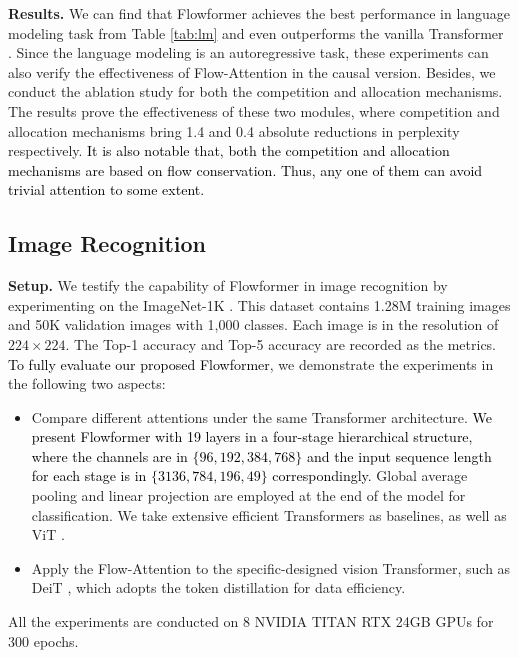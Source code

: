 \documentclass[nohyperref]{article}
\theoremstyle{plain}
\theoremstyle{definition}
\theoremstyle{remark}
\newcommand{\update}[1]{{\textcolor{black}{#1}}}
\begin{document}
\textbf{Results.} We can find that Flowformer achieves the best performance in language modeling task from Table \ref{tab:lm} and even outperforms the vanilla Transformer \cite{NIPS2017_3f5ee243}. Since the language modeling is an autoregressive task, these experiments can also verify the effectiveness of Flow-Attention in the causal version. Besides, we conduct the ablation study for both the competition and allocation mechanisms. The results prove the effectiveness of these two modules, where competition and allocation mechanisms bring 1.4 and 0.4 absolute reductions in perplexity respectively. \update{It is also notable that, both the competition and allocation mechanisms are based on flow conservation. Thus, any one of them can avoid trivial attention to some extent.}


\subsection{Image Recognition}

\textbf{Setup.} We testify the capability of Flowformer in image recognition by experimenting on the ImageNet-1K \cite{Deng2009ImageNetAL}. This dataset contains 1.28M training images and 50K validation images with 1,000 classes. Each image is in the resolution of $224\times 224$. The Top-1 accuracy and Top-5 accuracy are recorded as the metrics. \update{To fully evaluate our proposed Flowformer}, we demonstrate the experiments in the following two aspects:
\begin{itemize}
    \item Compare different attentions under the same Transformer architecture. \update{We present Flowformer with 19 layers in a four-stage hierarchical structure, where the channels are in $\{96,192,384,768\}$ and the input sequence length for each stage is in $\{3136,784,196,49\}$ correspondingly.} Global average pooling and linear projection are employed at the end of the model for classification. We take extensive efficient Transformers as baselines, as well as ViT \citeyearpar{dosovitskiy2021an}.
    \item Apply the Flow-Attention to the specific-designed vision Transformer, such as DeiT \cite{Touvron2021TrainingDI}, which adopts the token distillation for data efficiency.
\end{itemize}
All the experiments are conducted on 8 NVIDIA TITAN RTX 24GB GPUs for 300 epochs.
\end{document}
